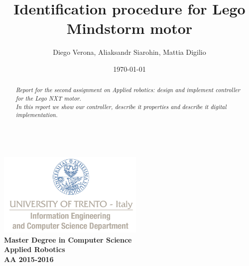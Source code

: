 \documentclass[a4paper,12pt,oneside]{article}
\title{Identification procedure for Lego Mindstorm motor}
\author{Diego Verona, Aliaksandr Siarohin, Mattia Digilio}
\date{\today}
\begin{document}
\makeatletter  %
\begin{titlepage}
      \centering
      ~~~~~~~~~~~~~\\[-30mm]
      \includegraphics[keepaspectratio=true, width=7cm]{bg_eng_1r.jpg} \\[10mm]

     {
     \large \bfseries Master Degree in Computer Science\\[3mm] 
     Applied Robotics\\[3mm]
     AA 2015-2016
     }\\[10mm]


     \vspace{0.5cm}
     {
     \Large \bfseries \textcolor{blue}{\@title} \par
     }
     \vspace{0.5cm}
     \vspace{0.2cm}

     {\large {\@author}}
     \\ \vspace{.2cm}
     \@date

     \vspace{0.6cm}


\begin{abstract}

\textit{
  Report for the second assignment on Applied robotics: design and implement controller for the Lego NXT motor.\\In this report we show our controller, describe it properties and describe it digital implementation.
}


\end{abstract}

\end{titlepage}
\end{document}
